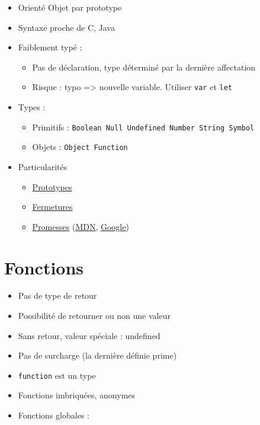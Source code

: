 \begin{itemize}
\tightlist
\item
  Orienté Objet par prototype
\item
  Syntaxe proche de C, Java
\item
  Faiblement typé :

  \begin{itemize}
  \tightlist
  \item
    Pas de déclaration, type déterminé par la dernière affectation
  \item
    Risque : typo =\textgreater{} nouvelle variable. Utiliser
    \textenglish{\texttt{var}} et \textenglish{\texttt{let}}
  \end{itemize}
\item
  Types :

  \begin{itemize}
  \tightlist
  \item
    Primitifs :
    \textenglish{\texttt{Boolean\ Null\ Undefined\ Number\ String\ Symbol}}
  \item
    Objets : \textenglish{\texttt{Object\ Function}}
  \end{itemize}
\item
  Particularités

  \begin{itemize}
  \tightlist
  \item
    \href{https://developer.mozilla.org/fr/docs/Web/JavaScript/Guide/Le_mod\%C3\%A8le_objet_JavaScript_en_d\%C3\%A9tails}{Prototypes}
  \item
    \href{http://www.w3schools.com/js/js_function_closures.asp}{Fermetures}
  \item
    \href{https://www.promisejs.org/}{Promesses}
    (\href{https://developer.mozilla.org/en/docs/Web/JavaScript/Reference/Global_Objects/Promise}{MDN},
    \href{https://developers.google.com/web/fundamentals/getting-started/primers/promises}{Google})
  \end{itemize}
\end{itemize}

\hypertarget{fonctions}{%
\section{Fonctions}\label{fonctions}}

\begin{itemize}
\tightlist
\item
  Pas de type de retour
\item
  Possibilité de retourner ou non une valeur
\item
  Sans retour, valeur spéciale : undefined
\item
  Pas de surcharge (la dernière définie prime)
\item
  \textenglish{\texttt{function}} est un type
\item
  Fonctions imbriquées, anonymes
\item
  Fonctions globales :
\end{itemize}

